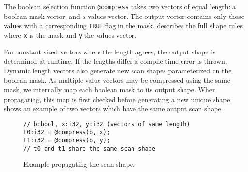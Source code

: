 The boolean selection function \texttt{@compress} takes two vectors of equal
length: a boolean mask vector, and a values vector. The output vector contains only
those values with a corresponding \texttt{TRUE} flag in the mask. 
describes the full shape rules where \texttt{x} is the mask and \texttt{y} the values
vector.

For constant sized vectors where the length agrees, the output shape is determined at
runtime. If the lengths differ a compile-time error is thrown. Dynamic length vectors
also generate new scan shapes parameterized on the boolean mask. As multiple value
vectors may be compressed using the same mask, we internally map each boolean mask
to its output shape. When propagating, this map is first checked before generating
a new unique shape.  shows an example of two vectors which
have the same output scan shape.

\begin{figure}[htbp]
\begin{lstlisting}[language=HorseIR, frame=single, basicstyle=\footnotesize]
// b:bool, x:i32, y:i32 (vectors of same length)
t0:i32 = @compress(b, x);
t1:i32 = @compress(b, y);
// t0 and t1 share the same scan shape
\end{lstlisting}
\caption{Example propagating the scan shape.} \label{fig:scan_shape}
\end{figure}




